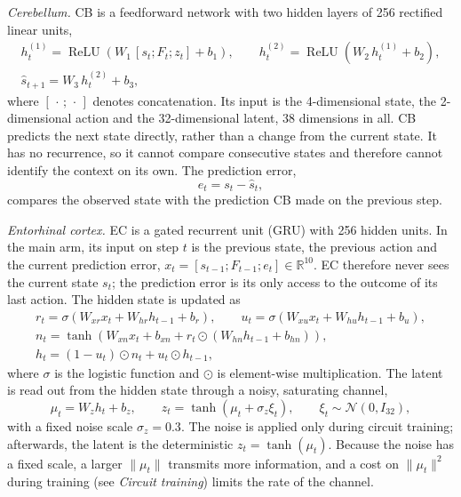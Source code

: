 \textit{Cerebellum.} CB is a feedforward network with two hidden layers of 256 rectified linear units,
\begin{gather}
    h^{(1)}_t = \operatorname{ReLU}\!\left( W_1 \, [s_t; F_t; z_t] + b_1 \right), \qquad
    h^{(2)}_t = \operatorname{ReLU}\!\left( W_2 \, h^{(1)}_t + b_2 \right), \\
    \hat{s}_{t+1} = W_3 \, h^{(2)}_t + b_3,
\end{gather}
where $[\,\cdot\,;\,\cdot\,]$ denotes concatenation. Its input is the 4-dimensional state, the 2-dimensional action and the 32-dimensional latent, 38 dimensions in all. CB predicts the next state directly, rather than a change from the current state. It has no recurrence, so it cannot compare consecutive states and therefore cannot identify the context on its own. The prediction error,
\begin{equation}
    e_t = s_t - \hat{s}_t,
\end{equation}
compares the observed state with the prediction CB made on the previous step.

\textit{Entorhinal cortex.} EC is a gated recurrent unit (GRU) with 256 hidden units. In the main arm, its input on step $t$ is the previous state, the previous action and the current prediction error, $x_t = [s_{t-1}; F_{t-1}; e_t] \in \mathbb{R}^{10}$. EC therefore never sees the current state $s_t$; the prediction error is its only access to the outcome of its last action. The hidden state is updated as
\begin{gather}
    r_t = \sigma\!\left( W_{xr} x_t + W_{hr} h_{t-1} + b_r \right), \qquad
    u_t = \sigma\!\left( W_{xu} x_t + W_{hu} h_{t-1} + b_u \right), \\
    n_t = \tanh\!\left( W_{xn} x_t + b_{xn} + r_t \odot \left( W_{hn} h_{t-1} + b_{hn} \right) \right), \\
    h_t = (1 - u_t) \odot n_t + u_t \odot h_{t-1},
\end{gather}
where $\sigma$ is the logistic function and $\odot$ is element-wise multiplication. The latent is read out from the hidden state through a noisy, saturating channel,
\begin{equation}
    \mu_t = W_z h_t + b_z, \qquad
    z_t = \tanh\!\left( \mu_t + \sigma_z \xi_t \right), \qquad \xi_t \sim \mathcal{N}(0, I_{32}),
\end{equation}
with a fixed noise scale $\sigma_z = 0.3$. The noise is applied only during circuit training; afterwards, the latent is the deterministic $z_t = \tanh(\mu_t)$. Because the noise has a fixed scale, a larger $\lVert \mu_t \rVert$ transmits more information, and a cost on $\lVert \mu_t \rVert^2$ during training (see \textit{Circuit training}) limits the rate of the channel.

